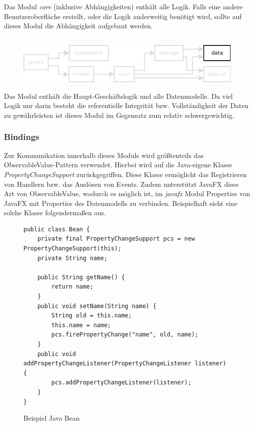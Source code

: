 Das Modul \textit{core} (inklusive Abhängigkeiten) enthält alle Logik. Falls eine andere Benutzeroberfläche erstellt,
oder die Logik anderweitig benötigt wird, sollte auf dieses Modul die Abhängigkeit aufgebaut werden.




\subsection{\textModData}
\label{\textModData}
\begin{figure}[H]
	\centering
	\includegraphics[width=.8\textwidth]{module_dependencies_data.png}
\end{figure}

Das Modul enthält die Haupt-Geschäftslogik und alle Datenmodelle. Da viel Logik nur darin besteht
die referentielle Integrität bzw. Vollständigkeit der Daten zu gewährleisten ist dieses Modul im Gegensatz zum
 relativ schwergewichtig.

\subsubsection{Bindings}
Zur Kommunikation innerhalb dieses Moduls wird größtenteils das ObservableValue-Pattern verwendet. Hierbei wird auf
die Java-eigene Klasse \textit{PropertyChangeSupport} zurückgegriffen. Diese Klasse ermöglicht das Registrieren
von Handlern bzw. das Auslösen von Events. Zudem unterstützt JavaFX diese Art von ObservableValue, wodurch es
möglich ist, im \textit{javafx} Modul Properties von JavaFX mit Properties des Datenmodells zu verbinden. Beispielhaft
sieht eine solche Klasse folgendermaßen aus.

\begin{figure}[H]
	\centering
	\begin{lstlisting}
public class Bean {
    private final PropertyChangeSupport pcs = new PropertyChangeSupport(this);
    private String name;

    public String getName() {
    	return name;
    }
    public void setName(String name) {
    	String old = this.name;
    	this.name = name;
    	pcs.firePropertyChange("name", old, name);
    }
    public void addPropertyChangeListener(PropertyChangeListener listener) {
    	pcs.addPropertyChangeListener(listener);
    }
}
	\end{lstlisting}
	\caption{Beispiel Java Bean}
\end{figure}

